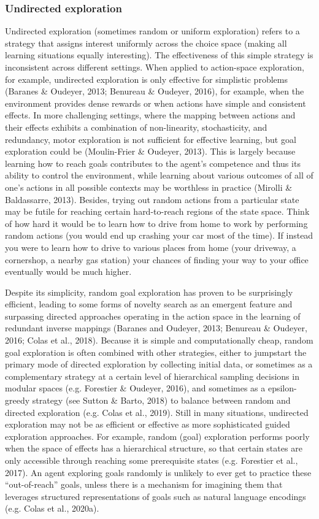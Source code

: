 \subsubsection{Undirected exploration}
Undirected exploration (sometimes random or uniform exploration) refers to a strategy that assigns interest uniformly across the choice space (making all learning situations equally interesting). The effectiveness of this simple strategy is inconsistent across different settings. When applied to action-space exploration, for example, undirected exploration is only effective for simplistic problems (Baranes \& Oudeyer, 2013; Benureau \& Oudeyer, 2016), for example, when the environment provides dense rewards or when actions have simple and consistent effects. In more challenging settings, where the mapping between actions and their effects exhibits a combination of non-linearity, stochasticity, and redundancy, motor exploration is not sufficient for effective learning, but goal exploration could be (Moulin-Frier \& Oudeyer, 2013). This is largely because learning how to reach goals contributes to the agent’s competence and thus its ability to control the environment, while learning about various outcomes of all of one’s actions in all possible contexts may be worthless in practice (Mirolli \& Baldassarre, 2013). Besides, trying out random actions from a particular state may be futile for reaching certain hard-to-reach regions of the state space. Think of how hard it would be to learn how to drive from home to work by performing random actions (you would end up crashing your car most of the time). If instead you were to learn how to drive to various places from home (your driveway, a cornershop, a nearby gas station) your chances of finding your way to your office eventually would be much higher. 

Despite its simplicity, random goal exploration has proven to be surprisingly efficient, leading to some forms of novelty search as an emergent feature and surpassing directed approaches operating in the action space in the learning of redundant inverse mappings (Baranes and Oudeyer, 2013; Benureau \& Oudeyer, 2016; Colas et al., 2018). Because it is simple and computationally cheap, random goal exploration is often combined with other strategies, either to jumpstart the primary mode of directed exploration by collecting initial data, or sometimes as a complementary strategy at a certain level of hierarchical sampling decisions in modular spaces (e.g. Forestier \& Oudeyer, 2016), and sometimes as a epsilon-greedy strategy (see Sutton \& Barto, 2018) to balance between random and directed exploration (e.g. Colas et al., 2019). Still in many situations, undirected exploration may not be as efficient or effective as more sophisticated guided exploration approaches. For example, random (goal) exploration performs poorly when the space of effects has a hierarchical structure, so that certain states are only accessible through reaching some prerequisite states (e.g. Forestier et al., 2017). An agent exploring goals randomly is unlikely to ever get to practice these “out-of-reach” goals, unless there is a mechanism for imagining them that leverages structured representations of goals such as natural language encodings (e.g. Colas et al., 2020a).

